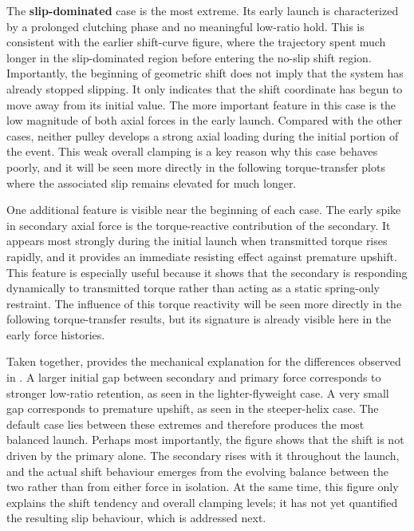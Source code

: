 \documentclass[11pt]{article}
\numberwithin{equation}{section}
\begin{document}
The \textbf{slip-dominated} case is the most extreme. Its early launch is
characterized by a prolonged clutching phase and no meaningful low-ratio hold.
This is consistent with the earlier shift-curve figure, where the trajectory
spent much longer in the slip-dominated region before entering the no-slip
shift region. Importantly, the beginning of geometric shift does not imply that
the system has already stopped slipping. It only indicates that the shift
coordinate has begun to move away from its initial value. The more important
feature in this case is the low magnitude of both axial forces in the early
launch. Compared with the other cases, neither pulley develops a strong axial
loading during the initial portion of the event. This weak overall clamping is
a key reason why this case behaves poorly, and it will be seen more directly in
the following torque-transfer plots where the associated slip remains elevated
for much longer.

One additional feature is visible near the beginning of each case. The early
spike in secondary axial force is the torque-reactive contribution of the
secondary. It appears most strongly during the initial launch when transmitted
torque rises rapidly, and it provides an immediate resisting effect against
premature upshift. This feature is especially useful because it shows that the
secondary is responding dynamically to transmitted torque rather than acting as
a static spring-only restraint. The influence of this torque reactivity will be
seen more directly in the following torque-transfer results, but its signature
is already visible here in the early force histories.

Taken together,  provides the mechanical
explanation for the differences observed in . A larger
initial gap between secondary and primary force corresponds to stronger
low-ratio retention, as seen in the lighter-flyweight case. A very small gap
corresponds to premature upshift, as seen in the steeper-helix case. The
default case lies between these extremes and therefore produces the most
balanced launch. Perhaps most importantly, the figure shows that the shift is
not driven by the primary alone. The secondary rises with it throughout the
launch, and the actual shift behaviour emerges from the evolving balance between
the two rather than from either force in isolation. At the same time, this
figure only explains the shift tendency and overall clamping levels; it has not
yet quantified the resulting slip behaviour, which is addressed next.
\end{document}
